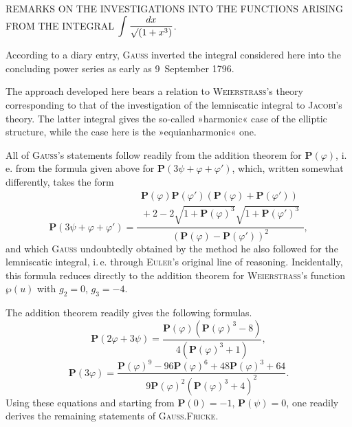 %
\begin{center}
REMARKS ON THE INVESTIGATIONS INTO THE FUNCTIONS ARISING FROM THE INTEGRAL
$\displaystyle\int\frac{dx}{\mathord{\surd}(1+x^3)}$.
\end{center}

\noindent\hspace*{\parindent}According to a diary entry, \textsc{Gauss} inverted the integral considered here
into the concluding power series as early as 9\ September 1796.

The approach developed here bears a relation to \textsc{Weierstrass}’s theory corresponding to
that of the investigation of the lemniscatic integral to \textsc{Jacobi}’s theory.
The latter integral gives the so-called »harmonic« case of the elliptic
structure, while the case here is the »equianharmonic« one.

All of \textsc{Gauss}’s statements follow readily from the addition theorem
for $\boldsymbol{P}(\varphi)$, i.\,e. from the formula given above for
$\boldsymbol{P}(3\psi+\varphi+\varphi')$, which, written somewhat differently, takes the form
\[
\boldsymbol{P}(3\psi+\varphi+\varphi')=
\frac{\begin{gathered}\boldsymbol{P}(\varphi)\boldsymbol{P}(\varphi')
(\boldsymbol{P}(\varphi)+\boldsymbol{P}(\varphi'))\\{}
+2-2\sqrt{1+\boldsymbol{P}(\varphi)^3}\sqrt{1+\boldsymbol{P}(\varphi')^3}\end{gathered}}
{(\boldsymbol{P}(\varphi)-\boldsymbol{P}(\varphi'))^2},
\]
\noindent and which \textsc{Gauss} undoubtedly obtained by the method he also followed for the
lemniscatic integral, i.\,e. through \textsc{Euler}’s original line of reasoning.
Incidentally, this formula reduces directly to the addition theorem for
\textsc{Weierstrass}’s function $\wp(u)$ with $g_2=0$, $g_3=-4$.

The addition theorem readily gives the following formulas.
\[
\boldsymbol{P}(2\varphi+3\psi)=\frac{\boldsymbol{P}(\varphi)(\boldsymbol{P}(\varphi)^3-8)}
{4(\boldsymbol{P}(\varphi)^3+1)},
\]
\[
\boldsymbol{P}(3\varphi)=\frac{\boldsymbol{P}(\varphi)^9-96\boldsymbol{P}(\varphi)^6+48\boldsymbol{P}(\varphi)^3+64}
{9\boldsymbol{P}(\varphi)^2(\boldsymbol{P}(\varphi)^3+4)^2}.
\]
\noindent Using these equations and starting from $\boldsymbol{P}(0)=-1$,
$\boldsymbol{P}(\psi)=0$, one readily derives the remaining statements of \textsc{Gauss}.\hfill\textsc{Fricke.}

